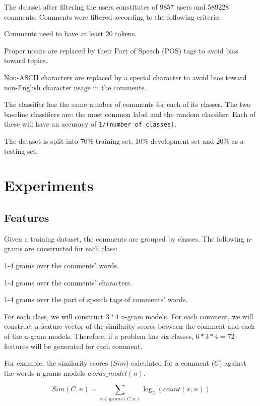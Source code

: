 \documentclass[10pt,a5paper,twoside]{article}
\begin{document}
The dataset after filtering the users constitutes of 9857 users and 589228
comments. Comments were filtered according to the following criteria:
\begin{compactitem}
\item Comments need to have at least 20 tokens.
\item Proper nouns are replaced by their Part of Speech (POS) tags to avoid bias toward topics.
\item Non-ASCII characters are replaced by a special character to avoid bias
toward non-English character usage in the comments.
\item The classifier has the same number of comments for each of its classes.
  The two baseline classifiers are: the most common label and the random
  classifier. Each of these will have an accuracy of \verb+1/(number of classes)+.
\item The dataset is split into 70\% training set, 10\% development set and 20\%
as a testing set.
\end{compactitem}

\section{Experiments}
\label{exps_sec}
\subsection{Features}
\label{features}
Given a training dataset, the comments are grouped by classes. The following
n-grams are constructed for each class:
\begin{compactitem}
\item 1-4 grams over the comments' words.
\item 1-4 grams over the comments' characters.
\item 1-4 grams over the part of speech tags of comments' words.
\end{compactitem}
For each class, we will construct $3*4$ n-gram models. For each comment, we will
construct a feature vector of the similarity scores between
the comment and each of the n-gram models. Therefore, if a problem has six
classes, $6*3*4 = 72$ features will be generated for each comment.

For example, the similarity scores ($Sim$) calculated for a comment ($C$)
against the words n-grams models $words\_model(n)$.

\[
  Sim(C, n) = \sum_{x \in grams(C,n)} \log_2 (count(x, n))
\]
\end{document}
